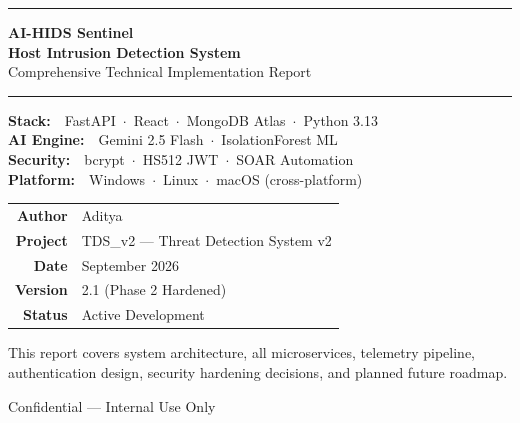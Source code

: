 \documentclass[12pt,a4paper]{article}
\begin{document}
\begin{titlepage}
    \centering
    \vspace*{2cm}

    {\color{primary}\rule{\linewidth}{2pt}}
    \vspace{0.4cm}

    {\Huge\bfseries\color{darkgray} AI-HIDS Sentinel}\\[0.3cm]
    {\Large\bfseries\color{primary} Host Intrusion Detection System}\\[0.2cm]
    {\large\color{darkgray} Comprehensive Technical Implementation Report}

    \vspace{0.4cm}
    {\color{primary}\rule{\linewidth}{2pt}}

    \vspace{1.5cm}

    \begin{tcolorbox}[
        enhanced, width=0.8\linewidth,
        colback=primary!8, colframe=primary!40,
        arc=8pt, boxrule=0.6pt,
        halign=center
    ]
        \textbf{Stack:}~~FastAPI~$\cdot$~React~$\cdot$~MongoDB Atlas~$\cdot$~Python 3.13\\
        \textbf{AI Engine:}~~Gemini 2.5 Flash~$\cdot$~IsolationForest ML\\
        \textbf{Security:}~~bcrypt~$\cdot$~HS512 JWT~$\cdot$~SOAR Automation\\
        \textbf{Platform:}~~Windows~$\cdot$~Linux~$\cdot$~macOS (cross-platform)
    \end{tcolorbox}

    \vspace{2cm}

    \begin{tabular}{rl}
        \textbf{Author}   & Aditya \\[4pt]
        \textbf{Project}  & TDS\_v2 — Threat Detection System v2 \\[4pt]
        \textbf{Date}     & September 2026 \\[4pt]
        \textbf{Version}  & 2.1 (Phase 2 Hardened) \\[4pt]
        \textbf{Status}   & Active Development \\
    \end{tabular}

    \vfill

    \begin{tcolorbox}[
        enhanced, colback=darkgray, colframe=darkgray,
        arc=6pt, boxrule=0pt,
        halign=center, fontupper=\color{white}\small
    ]
        This report covers system architecture, all microservices, telemetry pipeline,
        authentication design, security hardening decisions, and planned future roadmap.
    \end{tcolorbox}

    \vspace{0.5cm}
    {\small\color{darkgray} Confidential — Internal Use Only}
\end{titlepage}
\end{document}
